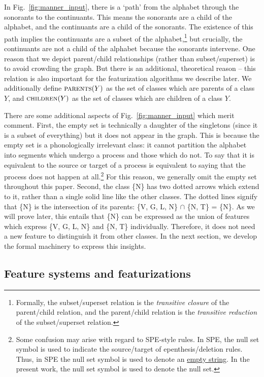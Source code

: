 \documentclass[11pt, oneside]{article}   	%
\begin{document}
In Fig.~\ref{fig:manner_input}, there is a `path' from the alphabet through the sonorants to the continuants. This means the sonorants are a child of the alphabet, and the continuants are a child of the sonorants. The existence of this path implies the continuants are a subset of the alphabet,\footnote{Formally, the subset/superset relation is the \textit{transitive closure} of the parent/child relation, and the parent/child relation is the \textit{transitive reduction} of the subset/superset relation.} but crucially, the continuants are not a child of the alphabet because the sonorants intervene. One reason that we depict  parent/child relationships (rather than subset/superset) is to avoid crowding the graph. But there is an additional, theoretical reason -- this relation is also important for the featurization algorithms we describe later. We additionally define $\textsc{parents}(Y)$ as the set of classes which are parents of a class $Y$, and $\textsc{children}(Y)$ as the set of classes which are children of a class $Y$.

There are some additional aspects of Fig.~\ref{fig:manner_input} which merit comment. First, the empty set is technically a daughter of the singletons (since it is a subset of everything) but it does not appear in the graph. This is because the empty set is a phonologically irrelevant class: it cannot partition the alphabet into segments which undergo a process and those which do not. To say that it is equivalent to the source or target of a process is equivalent to saying that the process does not happen at all.\footnote{Some confusion may arise with regard to SPE-style rules. In SPE, the null set symbol is used to indicate the source/target of epenthesis/deletion rules. Thus, in SPE the null set symbol is used to denote an \underline{empty string}. In the present work, the null set symbol is used to denote the null set.} For this reason, we generally omit the empty set throughout this paper. Second, the class \{N\} has two dotted arrows which extend to it, rather than a single solid line like the other classes. The dotted lines signify that \{N\} is the intersection of its parents: \{V, G, L, N\} $\cap$ \{N, T\} = \{N\}. As we will prove later, this entails that \{N\} can be expressed as the union of features which express \{V, G, L, N\} and \{N, T\} individually. Therefore, it does not need a new feature to distinguish it from other classes. In the next section, we develop the formal machinery to express this insights.

\subsection{Feature systems and featurizations}
\end{document}
